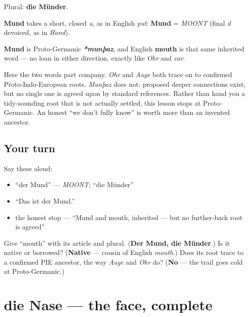 Plural: \textbf{die Münder}.

\begin{sounds}
\textbf{Mund} takes a short, closed \emph{u}, as in English \emph{put}: \textbf{Mund} = \emph{MOONT} (final \emph{d} devoiced, as in \emph{Hand}).
\end{sounds}

\begin{cousinweb}
\textbf{Mund} is Proto-Germanic \emph{\textbf{*munþaz}}, and English \textbf{mouth} is that same inherited word — no loan in either direction, exactly like \emph{Ohr} and \emph{ear}.

Here the two words part company. \emph{Ohr} and \emph{Auge} both trace on to confirmed Proto-Indo-European roots. \emph{Munþaz} does not: proposed deeper connections exist, but no single one is agreed upon by standard references. Rather than hand you a tidy-sounding root that is not actually settled, this lesson stops at Proto-Germanic. An honest \textquotedblleft{}we don't fully know\textquotedblright{} is worth more than an invented ancestor.
\end{cousinweb}

\subsection*{Your turn}
Say these aloud:

\begin{itemize}
\raggedright
  \item \textquotedblleft{}der Mund\textquotedblright{} — \emph{MOONT}; \textquotedblleft{}die Münder\textquotedblright{}
  \item \textquotedblleft{}Das ist der Mund.\textquotedblright{}
  \item the honest stop — \textquotedblleft{}Mund and mouth, inherited — but no further-back root is agreed\textquotedblright{}
\end{itemize}

\begin{tcolorbox}[breakable,colback=teal!4,colframe=teal!35!black,title={Before you move on}]
Give \textquotedblleft{}mouth\textquotedblright{} with its article and plural. (\textbf{Der Mund, die Münder}.) Is it native or borrowed? (\textbf{Native} — cousin of English \emph{mouth}.) Does its root trace to a confirmed PIE ancestor, the way \emph{Auge} and \emph{Ohr} do? (\textbf{No} — the trail goes cold at Proto-Germanic.)
\end{tcolorbox}
\section[die Nase]{die Nase — the face, complete}

